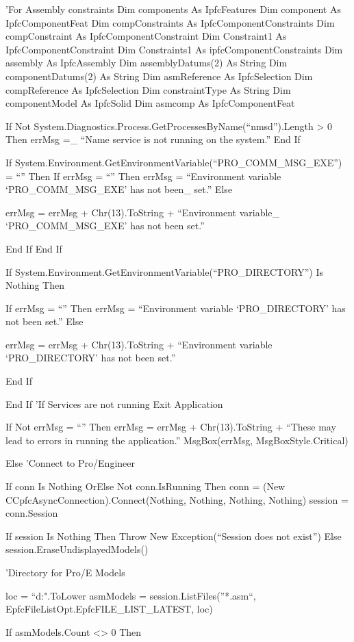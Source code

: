 \documentclass[]{article}
\begin{document}
'For Assembly constraints Dim components As IpfcFeatures Dim component
As IpfcComponentFeat Dim compConstraints As IpfcComponentConstraints Dim
compConstraint As IpfcComponentConstraint Dim Constraint1 As
IpfcComponentConstraint Dim Constraints1 As ipfcComponentConstraints Dim
assembly As IpfcAssembly Dim assemblyDatums(2) As String Dim
componentDatums(2) As String Dim asmReference As IpfcSelection Dim
compReference As IpfcSelection Dim constraintType As String Dim
componentModel As IpfcSolid Dim asmcomp As IpfcComponentFeat

If Not System.Diagnostics.Process.GetProcessesByName(``nmsd'').Length
\textgreater{} 0 Then errMsg =\_ ``Name service is not running on the
system.'' End If

If System.Environment.GetEnvironmentVariable(``PRO\_COMM\_MSG\_EXE'') =
``'' Then If errMsg = ``'' Then errMsg = ``Environment variable
`PRO\_COMM\_MSG\_EXE' has not been\_ set.'' Else

errMsg = errMsg + Chr(13).ToString + ``Environment variable\_
`PRO\_COMM\_MSG\_EXE' has not been set.''

End If End If

If System.Environment.GetEnvironmentVariable(``PRO\_DIRECTORY'') Is
Nothing Then

If errMsg = ``'' Then errMsg = ``Environment variable `PRO\_DIRECTORY'
has not been set.'' Else

errMsg = errMsg + Chr(13).ToString + ``Environment variable
`PRO\_DIRECTORY' has not been set.''

End If

End If 'If Services are not running Exit Application

If Not errMsg = ``'' Then errMsg = errMsg + Chr(13).ToString + ``These
may lead to errors in running the application.'' MsgBox(errMsg,
MsgBoxStyle.Critical)

Else 'Connect to Pro/Engineer

If conn Is Nothing OrElse Not conn.IsRunning Then conn = (New
CCpfcAsyncConnection).Connect(Nothing, Nothing, Nothing, Nothing)
session = conn.Session

If session Is Nothing Then Throw New Exception(``Session does not
exist'') Else session.EraseUndisplayedModels()

'Directory for Pro/E Models

loc = ``d:\proemodels".ToLower asmModels = session.ListFiles(''*.asm``,
EpfcFileListOpt.EpfcFILE\_LIST\_LATEST, loc)

If asmModels.Count \textless{}\textgreater{} 0 Then
\end{document}
